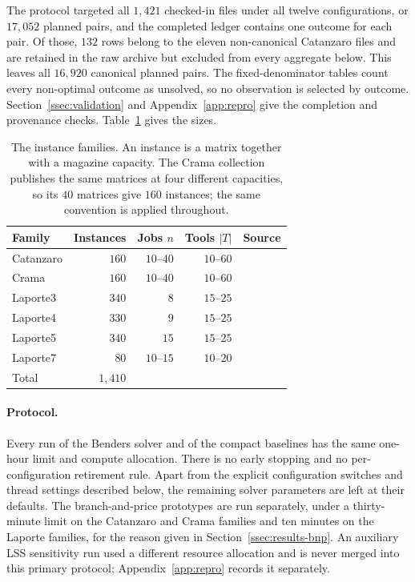 The protocol targeted all $1{,}421$ checked-in files under all twelve
configurations, or $17{,}052$ planned pairs, and the completed ledger contains one
outcome for each pair. Of those,
$132$ rows belong to the eleven non-canonical Catanzaro files and are retained in the
raw archive but excluded from every aggregate below. This leaves all $16{,}920$
canonical planned pairs. The fixed-denominator tables count every non-optimal outcome
as unsolved, so no observation is selected by outcome. Section~\ref{ssec:validation}
and Appendix~\ref{app:repro} give the completion and provenance checks.
Table~\ref{tab:families} gives the sizes.

\begin{table}[h]\centering
\footnotesize
\begin{tabular}{@{}lrrrl@{}}
\toprule
Family & Instances & Jobs $n$ & Tools $\lvert T\rvert$ & Source \\
\midrule
Catanzaro & $160$ & $10$--$40$ & $10$--$60$ & \citet{daSilva2024} \\
Crama     & $160$ & $10$--$40$ & $10$--$60$ & \citet{Crama1994} \\
Laporte3  & $340$ & $8$        & $15$--$25$ & \citet{Laporte2004} \\
Laporte4  & $330$ & $9$        & $15$--$25$ & \citet{Laporte2004} \\
Laporte5  & $340$ & $15$       & $15$--$25$ & \citet{Laporte2004} \\
Laporte7  & $80$  & $10$--$15$ & $10$--$20$ & \citet{Laporte2004} \\
\midrule
Total     & $1{,}410$ & & & \\
\bottomrule
\end{tabular}
\caption{The instance families. An instance is a matrix together with a magazine
capacity. The Crama collection publishes the same matrices at four different
capacities, so its $40$ matrices give $160$ instances; the same convention is applied
throughout.}
\label{tab:families}
\end{table}

\paragraph{Protocol.}
Every run of the Benders solver and of the compact baselines has the same one-hour
limit and compute allocation. There is no early stopping and no
per-configuration retirement rule. Apart from the explicit configuration switches and
thread settings described below, the remaining solver parameters are left at their
defaults. The branch-and-price prototypes are run separately, under a thirty-minute limit
on the Catanzaro and Crama families and ten minutes on the Laporte families, for the
reason given in Section~\ref{ssec:results-bnp}.
An auxiliary LSS sensitivity run used a different resource allocation and is never
merged into this primary protocol; Appendix~\ref{app:repro} records it separately.

